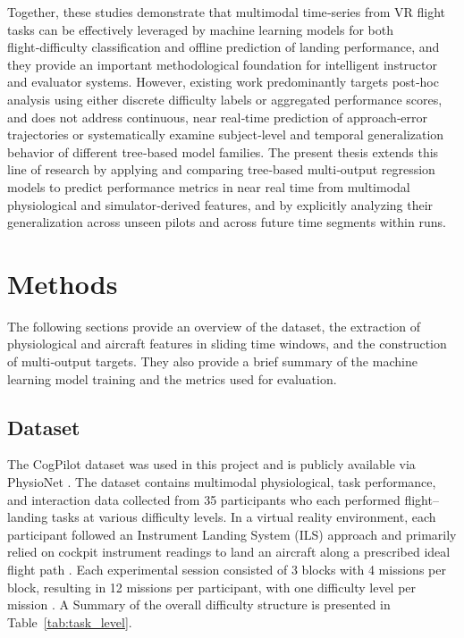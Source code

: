 \documentclass[11pt, a4paper]{article}
\begin{document}
Together, these studies demonstrate that multimodal time‑series from VR flight tasks can be effectively leveraged by machine learning models for both flight‑difficulty classification and offline prediction of landing performance, and they provide an important methodological foundation for intelligent instructor and evaluator systems. However, existing work predominantly targets post‑hoc analysis using either discrete difficulty labels or aggregated performance scores, and does not address continuous, near real‑time prediction of approach‑error trajectories or systematically examine subject‑level and temporal generalization behavior of different tree‑based model families. The present thesis extends this line of research by applying and comparing tree‑based multi‑output regression models to predict performance metrics in near real time from multimodal physiological and simulator‑derived features, and by explicitly analyzing their generalization across unseen pilots and across future time segments within runs.


\section{Methods}
The following sections provide an overview of the dataset, the extraction of physiological and aircraft features in sliding time windows, and the construction of multi‑output targets. They also provide a brief summary of the machine learning model training and the metrics used for evaluation.

\subsection{Dataset}
The CogPilot \cite{rao-2022} dataset was used in this project and is publicly available via PhysioNet \cite{goldberger-2000}. The dataset contains multimodal physiological, task performance, and interaction data collected from 35 participants who each performed flight–landing tasks at various difficulty levels. In a virtual reality environment, each participant followed an Instrument Landing System (ILS) approach and primarily relied on cockpit instrument readings to land an aircraft along a prescribed ideal flight path \cite{rao-2022}. Each experimental session consisted of 3 blocks with 4 missions per block, resulting in 12 missions per participant, with one difficulty level per mission \cite{rao-2022}. A Summary of the overall difficulty structure is presented in Table~\ref{tab:task_level}.
\end{document}
